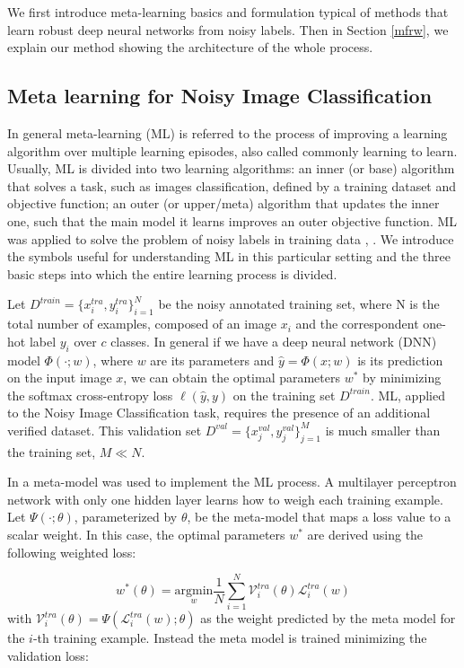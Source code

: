 \documentclass[runningheads]{llncs}
\begin{document}
	We first introduce meta-learning basics and formulation typical of methods that learn robust deep neural networks from noisy labels. Then in Section \ref{mfrw}, we explain our method showing the architecture of the whole process.
	
	\subsection{Meta learning for Noisy Image Classification}\label{back}
	
	In general meta-learning (ML) is referred to the process of improving a learning algorithm over multiple learning episodes, also called commonly learning to learn. Usually, ML is divided into two learning algorithms: an inner (or base) algorithm that solves a task, such as images classification, defined by a training dataset and objective function; an outer (or upper/meta) algorithm that updates the inner one, such that the main model it learns improves an outer objective function. ML was applied to solve the problem of noisy labels in training data \cite{ren2018learning}, \cite{shu2019meta}. We introduce the symbols useful for understanding ML in this particular setting and the three basic steps into which the entire learning process is divided.
	
	Let $D^{train} = \{x_i^{tra}, y_i^{tra}\}^N_{i=1}$ be the noisy annotated training set, where N is the total number of examples, composed of an image $x_i$ and the correspondent one-hot label $y_i$ over $c$ classes. In general if we have a deep neural network (DNN) model $\Phi(\cdot; w)$, where $w$ are its parameters and $ \hat{y} = \Phi(x; w)$ is its prediction on the input image $x$, we can obtain the optimal parameters $w^*$ by minimizing the softmax cross-entropy loss $\ell(\hat{y}, y)$ on the training set $D^{train}$. ML, applied to the Noisy Image Classification task, requires the presence of an additional verified dataset. This validation set $D^{val} = \{x_j^{val}, y_j^{val}\}^M_{j=1}$ is much smaller than the training set, $M \ll N$.
	
	In \cite{shu2019meta} a meta-model was used to implement the ML process. A multilayer perceptron network with only one hidden layer learns how to weigh each training example. Let $\Psi(\cdot;\theta)$, parameterized by $\theta$, be the meta-model that maps a loss value to a scalar weight. In this case, the optimal parameters $w^*$ are derived using the following weighted loss:
	
	\begin{equation}\label{MW1}
		w^* (\theta) = \underset{w}{\mathrm{argmin}} \frac{1}{N} \sum_{i=1}^{N} \mathcal{V}_i^{tra}(\theta)\mathcal{L}_i^{tra}(w)
	\end{equation}
	with $\mathcal{V}_i^{tra}(\theta) = \Psi(\mathcal{L}_i^{tra}(w);\theta)$ as the weight predicted by the meta model for the $i$-th training example. Instead the meta model is trained minimizing the validation loss:
	
\end{document}
